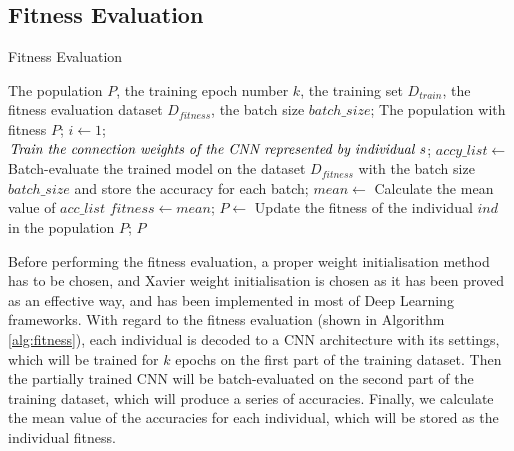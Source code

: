 \documentclass[conference]{IEEEtran}
\begin{document}
\subsection{Fitness Evaluation}
\begin{algorithm}
	\caption{Fitness Evaluation}
	\label{alg:fitness}
	\begin{algorithmic}
		\renewcommand{\algorithmicrequire}{\textbf{Input:}}
		\renewcommand{\algorithmicensure}{\textbf{Output:}}
		\REQUIRE The population $P$, the training epoch number $k$, the training set $D_{train}$, the fitness evaluation dataset $D_{fitness}$, the batch size $batch\_size$;
		\ENSURE The population with fitness $P$;
			\STATE $i \leftarrow 1$;
				\STATE $\textit{Train the connection weights of the CNN } \newline \textit{represented by individual s}$;
			\ENDWHILE
			\STATE $accy\_list \leftarrow$ Batch-evaluate the trained model on the dataset $D_{fitness}$ with the batch size $batch\_size$ and store the accuracy for each batch;
			\STATE $mean \leftarrow$ Calculate the mean value of  $acc\_list$
			\STATE $fitness \leftarrow mean$;
			\STATE $P \leftarrow$ Update the fitness of the individual $ind$ in the population $P$;
		\ENDFOR
		\RETURN $P$
	\end{algorithmic}
\end{algorithm}

Before performing the fitness evaluation, a proper weight initialisation method has to be chosen, and Xavier weight initialisation \cite{WeightIniti:Glorot} is chosen as it has been proved as an effective way, and has been implemented in most of Deep Learning frameworks. With regard to the fitness evaluation (shown in Algorithm \ref{alg:fitness}), each individual is decoded to a CNN architecture with its settings, which will be trained for $k$ epochs on the first part of the training dataset. Then the partially trained CNN will be batch-evaluated on the second part of the training dataset, which will produce a series of accuracies. Finally, we calculate the mean value of the accuracies for each individual, which will be stored as the individual fitness.
\end{document}
